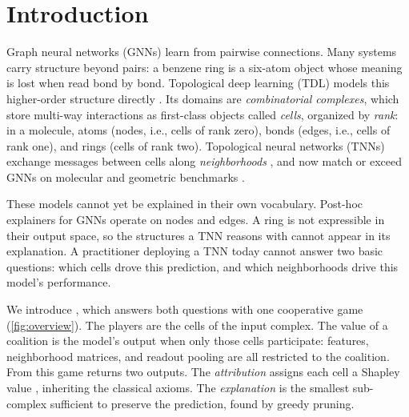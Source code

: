 \section{Introduction}
\label{sec:introduction}

Graph neural networks (GNNs) learn from pairwise connections. Many
systems carry structure beyond pairs: a benzene ring is a six-atom
object whose meaning is lost when read bond by bond. Topological deep
learning (TDL) models this higher-order structure directly
\citep{hajij2023tdl,papamarkou2024position}. Its domains are
\emph{combinatorial complexes}, which store multi-way interactions as
first-class objects called \emph{cells}, organized by \emph{rank}: in a
molecule, atoms (nodes, i.e., cells of rank zero), bonds (edges, i.e.,
cells of rank one), and rings (cells of rank two). Topological neural
networks (TNNs) exchange messages between cells along
\emph{neighborhoods} \citep{bodnar2021cwn,papillon2025topotune,
hopse2025}, and now match or exceed GNNs on molecular and geometric
benchmarks \citep{telyatnikov2024topobench}.

These models cannot yet be explained in their own vocabulary. Post-hoc
explainers for GNNs \citep{ying2019gnnexplainer,luo2020parameterized,
yuan2021subgraphx,muschalik2024graphshapiq} operate on nodes and
edges. A ring is not expressible in their output space, so the
structures a TNN reasons with cannot appear in its explanation. A
practitioner deploying a TNN today cannot answer two basic questions:
which cells drove this prediction, and which neighborhoods drive this
model's performance.

We introduce \method, which answers both questions with one cooperative
game (\cref{fig:overview}). The players are the cells of the input
complex. The value of a coalition is the model's output when only those
cells participate: features, neighborhood matrices, and readout pooling
are all restricted to the coalition. From this game \method returns two
outputs. The \emph{attribution} assigns each cell a Shapley value
\citep{shapley1953value}, inheriting the classical axioms. The
\emph{explanation} is the smallest sub-complex sufficient to preserve
the prediction, found by greedy pruning.

